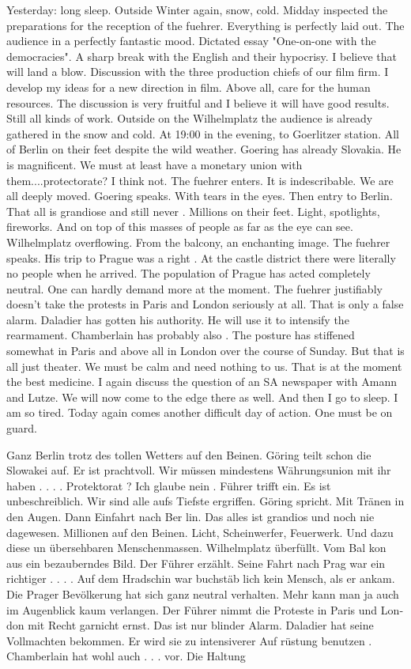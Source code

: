 Yesterday: long sleep. Outside Winter again, snow, cold. Midday inspected the preparations for the reception of the fuehrer. Everything is perfectly laid out. The audience in a perfectly fantastic mood. Dictated essay "One-on-one with the democracies". A sharp break with the English and their hypocrisy. I believe that will land a blow. Discussion with the three production chiefs of our film firm. I develop my ideas for a new direction in film. Above all, care for the human resources. The discussion is very fruitful and I believe it will have good results. Still all kinds of work. Outside on the Wilhelmplatz the audience is already gathered in the snow and cold. At 19:00 in the evening, to Goerlitzer station. All of Berlin on their feet despite the wild weather. Goering has already  Slovakia. He is magnificent. We must at least have a monetary union with them....protectorate? I think not. The fuehrer enters. It is indescribable. We are all deeply moved. Goering speaks. With tears in the eyes. Then entry to Berlin. That all is grandiose and still never . Millions on their feet. Light, spotlights, fireworks. And on top of this masses of people as far as the eye can see. Wilhelmplatz overflowing. From the balcony, an enchanting image. The fuehrer speaks. His trip to Prague was a right \missing. At the castle district there were literally no people when he arrived. The population of Prague has acted completely neutral. One can hardly demand more at the moment. The fuehrer justifiably doesn't take the protests in Paris and London seriously at all. That is only a false alarm. Daladier has gotten his authority. He will use it to intensify the rearmament. Chamberlain has probably also \missing. The posture has stiffened somewhat in Paris and above all in London over the course of Sunday. But that is all just theater. We must be calm and need \missing nothing to us. That is at the moment the best medicine. I again discuss the question of an SA newspaper with Amann and Lutze. We will now come to the edge there as well.  And then I go to sleep. I am so tired. Today again comes another difficult day of action. One must be on guard.

Ganz Berlin trotz des tollen Wetters auf den Beinen. Göring teilt schon die Slowakei auf. Er ist prachtvoll. Wir müssen mindestens Wäh­rungsunion mit ihr haben . . . . Protektorat ? Ich glaube nein . Führer trifft ein. Es ist unbeschreiblich. Wir sind alle aufs Tiefste ergriffen. Göring spricht. Mit Tränen in den Augen. Dann Einfahrt nach Ber­ lin. Das alles ist grandios und noch nie dagewesen. Millionen auf den Beinen. Licht, Scheinwerfer, Feuerwerk. Und dazu diese un­ übersehbaren Menschenmassen. Wilhelmplatz überfüllt. Vom Bal­ kon aus ein bezauberndes Bild. Der Führer erzählt. Seine Fahrt nach Prag war ein richtiger . . . . Auf dem Hradschin war buchstäb­ lich kein Mensch, als er ankam. Die Prager Bevölkerung hat sich ganz neutral verhalten. Mehr kann man ja auch im Augenblick kaum verlangen. Der Führer nimmt die Proteste in Paris und Lon­ don mit Recht garnicht ernst. Das ist nur blinder Alarm. Daladier hat seine Vollmachten bekommen. Er wird sie zu intensiverer Auf­ rüstung benutzen . Chamberlain hat wohl auch . . . vor. Die Haltung
